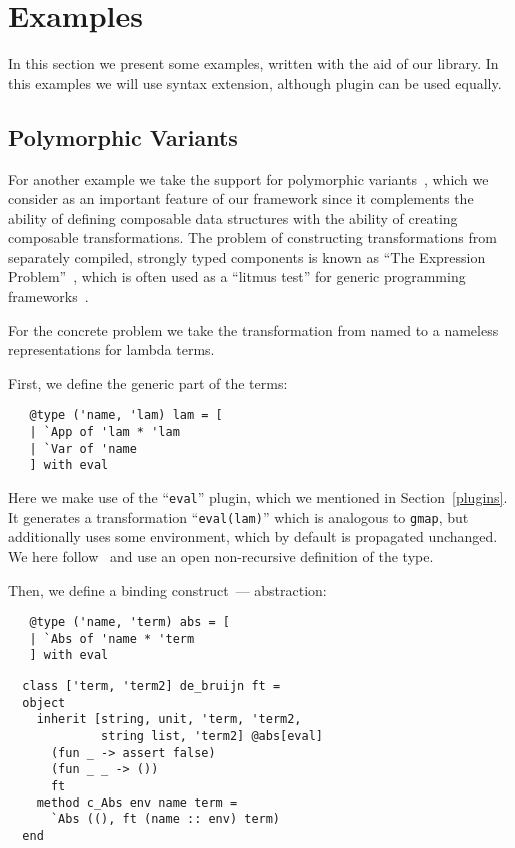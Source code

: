 \section{Examples}

In this section we present some examples, written with the aid of our library. In this examples we will use  syntax extension,
although  plugin can be used equally.


\subsection{Polymorphic Variants}

For another example we take the support for polymorphic variants~\cite{PolyVar,PolyVarReuse}, which we consider as an important feature of our framework
since it complements the ability of defining composable data structures with the ability of creating composable transformations. The problem of
constructing transformations from separately compiled, strongly typed components is known as ``The Expression Problem''~\cite{ExpressionProblem}, which
is often used as a ``litmus test'' for generic programming frameworks~\cite{ObjectAlgebras,ALaCarte}.

For the concrete problem we take the transformation from named to a nameless representations for lambda terms.

First, we define the generic part of the terms:

\begin{lstlisting}
   @type ('name, 'lam) lam = [
   | `App of 'lam * 'lam
   | `Var of 'name
   ] with eval
\end{lstlisting}

Here we make use of the ``\lstinline{eval}'' plugin, which we mentioned in Section~\ref{plugins}. It generates a transformation ``\lstinline{eval(lam)}'' which is analogous
to \lstinline{gmap}, but additionally uses some environment, which by default is propagated unchanged. We here follow~\cite{PolyVarReuse} and use an open non-recursive definition
of the type.

Then, we define a binding construct~--- abstraction:

\begin{lstlisting}
   @type ('name, 'term) abs = [
   | `Abs of 'name * 'term
   ] with eval
\end{lstlisting}

\begin{lstlisting}
  class ['term, 'term2] de_bruijn ft =
  object
    inherit [string, unit, 'term, 'term2,
             string list, 'term2] @abs[eval]
      (fun _ -> assert false)
      (fun _ _ -> ())
      ft
    method c_Abs env name term =
      `Abs ((), ft (name :: env) term)
  end
\end{lstlisting}

